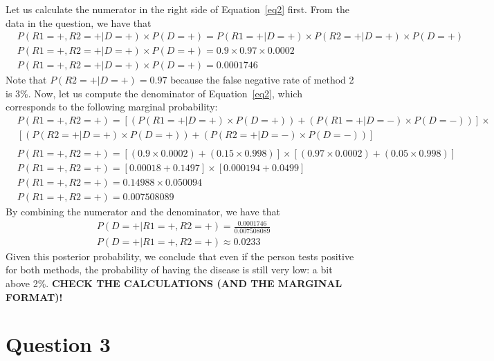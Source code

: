 \documentclass[leqno]{article}
\begin{document}
\noindent Let us calculate the numerator in the right side of Equation~\ref{eq2} first. From
the data in the question, we have that
\begin{equation*}
\begin{split}
&P(R1 = +, R2 = +| D = +) \times P(D = +) = P(R1 = +|D = +) \times P(R2 = +| D = +) \times P(D = +)
\\
&P(R1 = +, R2 = +| D = +) \times P(D = +) = 0.9 \times 0.97 \times 0.0002
\\
&P(R1 = +, R2 = +| D = +) \times P(D = +) = 0.0001746
\end{split}  
\end{equation*}  
Note that $P(R2 = +| D = +) = 0.97$ because the false negative rate of method 2 is 3\%. Now, let us
compute the denominator of Equation~\ref{eq2}, which corresponds to the following marginal
probability:
\begin{equation*}
\begin{split}
&P(R1 = +, R2 = +) = [(P(R1 = +|D = +) \times P(D = +)) + (P(R1 = +|D = -) \times P(D = -))] \times
\\
&[(P(R2 = +|D = +) \times P(D = +)) + (P(R2 = +|D = -) \times P(D = -))]
\\
\\
&P(R1 = +, R2 = +) = [(0.9 \times 0.0002) + (0.15 \times 0.998)] \times [(0.97 \times 0.0002) + (0.05 \times 0.998)]
\\
&P(R1 = +, R2 = +) = [0.00018 + 0.1497] \times [0.000194 + 0.0499]
\\
&P(R1 = +, R2 = +) = 0.14988 \times 0.050094
\\
&P(R1 = +, R2 = +) = 0.007508089
\end{split}  
\end{equation*}
By combining the numerator and the denominator, we have that
\begin{equation*}
\begin{split}
&P(D = +| R1 = +, R2 = +) = \frac{0.0001746}{0.007508089}
\\
&P(D = +| R1 = +, R2 = +) \approx 0.0233
\end{split}  
\end{equation*}
Given this posterior probability, we conclude that even if the person tests positive for both methods, the probability of having the
disease is still very low: a bit above 2\%. \textbf{CHECK THE CALCULATIONS (AND THE MARGINAL FORMAT)!}


\section*{Question 3}
\end{document}
